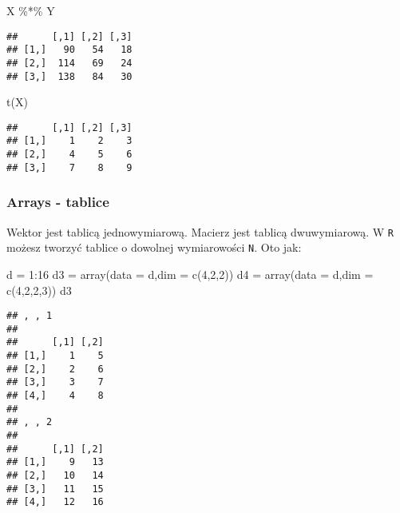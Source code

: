 \documentclass[
]{article}
\newenvironment{Shaded}{\begin{snugshade}}{\end{snugshade}}
\newcommand{\AttributeTok}[1]{\textcolor[rgb]{0.77,0.63,0.00}{#1}}
\newcommand{\DecValTok}[1]{\textcolor[rgb]{0.00,0.00,0.81}{#1}}
\newcommand{\FunctionTok}[1]{\textcolor[rgb]{0.00,0.00,0.00}{#1}}
\newcommand{\NormalTok}[1]{#1}
\newcommand{\OtherTok}[1]{\textcolor[rgb]{0.56,0.35,0.01}{#1}}
\newcommand{\SpecialCharTok}[1]{\textcolor[rgb]{0.00,0.00,0.00}{#1}}
\begin{document}
\begin{Shaded}
\begin{Highlighting}[]
\NormalTok{X }\SpecialCharTok{\%*\%}\NormalTok{ Y}
\end{Highlighting}
\end{Shaded}

\begin{verbatim}
##      [,1] [,2] [,3]
## [1,]   90   54   18
## [2,]  114   69   24
## [3,]  138   84   30
\end{verbatim}

\begin{Shaded}
\begin{Highlighting}[]
\FunctionTok{t}\NormalTok{(X)}
\end{Highlighting}
\end{Shaded}

\begin{verbatim}
##      [,1] [,2] [,3]
## [1,]    1    2    3
## [2,]    4    5    6
## [3,]    7    8    9
\end{verbatim}

\hypertarget{arrays---tablice}{%
\subsubsection{Arrays - tablice}\label{arrays---tablice}}

Wektor jest tablicą jednowymiarową. Macierz jest tablicą dwuwymiarową. W
\texttt{R} możesz tworzyć tablice o dowolnej wymiarowości \texttt{N}.
Oto jak:

\begin{Shaded}
\begin{Highlighting}[]
\NormalTok{d }\OtherTok{=} \DecValTok{1}\SpecialCharTok{:}\DecValTok{16}
\NormalTok{d3 }\OtherTok{=} \FunctionTok{array}\NormalTok{(}\AttributeTok{data =}\NormalTok{ d,}\AttributeTok{dim =} \FunctionTok{c}\NormalTok{(}\DecValTok{4}\NormalTok{,}\DecValTok{2}\NormalTok{,}\DecValTok{2}\NormalTok{))}
\NormalTok{d4 }\OtherTok{=} \FunctionTok{array}\NormalTok{(}\AttributeTok{data =}\NormalTok{ d,}\AttributeTok{dim =} \FunctionTok{c}\NormalTok{(}\DecValTok{4}\NormalTok{,}\DecValTok{2}\NormalTok{,}\DecValTok{2}\NormalTok{,}\DecValTok{3}\NormalTok{)) }
\NormalTok{d3}
\end{Highlighting}
\end{Shaded}

\begin{verbatim}
## , , 1
## 
##      [,1] [,2]
## [1,]    1    5
## [2,]    2    6
## [3,]    3    7
## [4,]    4    8
## 
## , , 2
## 
##      [,1] [,2]
## [1,]    9   13
## [2,]   10   14
## [3,]   11   15
## [4,]   12   16
\end{verbatim}
\end{document}
